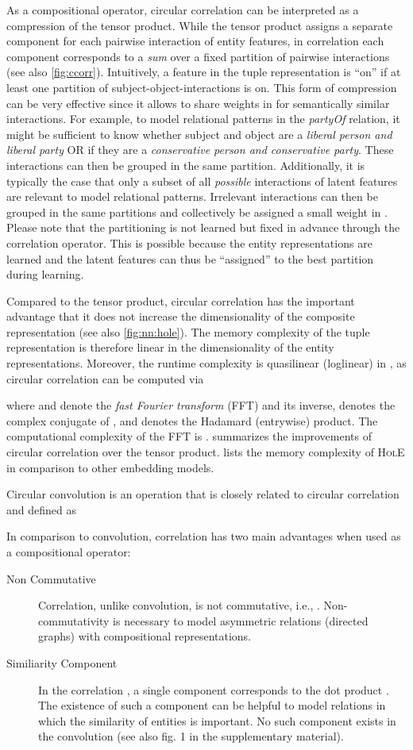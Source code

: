 \documentclass[letterpaper]{article}
\newcommand{\hole}{\textsc{HolE}\xspace}
\begin{document}
As a compositional operator, circular correlation can be interpreted as a
compression of the tensor product. While the tensor product assigns a separate
component  for each pairwise interaction of entity features, in correlation each
component corresponds to a \emph{sum} over a fixed partition of pairwise
interactions (see also \cref{fig:ccorr}).
Intuitively, a feature in the tuple representation is ``on'' if at least one
partition of subject-object-interactions is on.
This form of compression can be very effective since it allows to share weights
in  for semantically similar interactions. For example, to model
relational patterns in the \textit{partyOf} relation, it might be sufficient to
know whether subject and object are a \textit{liberal person and liberal party}
OR if they are a \textit{conservative person and conservative party}. These
interactions can then be grouped in the same partition.
Additionally, it is typically the case that only a
subset of all \emph{possible} interactions of latent features are relevant to model
relational patterns. Irrelevant interactions can then be grouped in the same
partitions and collectively be assigned a small weight in .
Please note that the partitioning is not learned but fixed in advance through
the correlation operator. This is possible because the entity representations
are learned and the latent features can thus be ``assigned'' to the best
partition during learning.


Compared to the tensor product, circular correlation has the important advantage
that it does not increase the dimensionality of the composite representation
(see also \cref{fig:nn:hole}).
The memory complexity of the tuple representation is therefore linear in the
dimensionality  of the entity representations. Moreover, the runtime complexity is 
quasilinear (loglinear) in , as circular correlation can be computed via

where  and  denote the \emph{fast Fourier transform} (FFT)
and its inverse,  denotes the complex conjugate of ,
and  denotes the Hadamard (entrywise) product.
The computational complexity of the FFT is .
 summarizes the improvements of circular correlation over the
tensor product.  lists the memory complexity of \hole in comparison to
other embedding models.


Circular convolution  is an operation that
is closely related to circular correlation and defined as

In comparison to convolution, correlation has two main advantages when used as a
compositional operator:
\begin{description}
\item[Non Commutative] Correlation, unlike convolution, is not commutative,
  i.e., . Non-commutativity is necessary to
  model asymmetric relations (directed graphs) with compositional representations.
\item[Similiarity Component] In the correlation , a single
  component  corresponds to the dot product . The existence of such a component can be helpful to model
  relations in which the similarity of entities is important. No
  such component exists in the convolution  (see also fig. 1 in the
  supplementary material).
\end{description}
\end{document}

